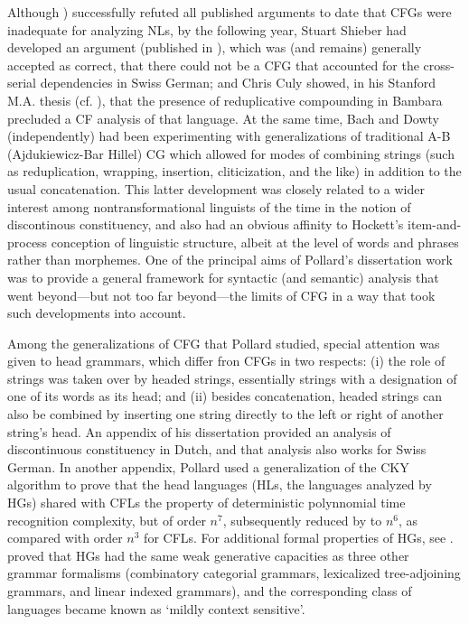 \documentclass[output=paper]{langsci/langscibook}
\begin{document}
Although \citet{PG82a-u-kopiert-original-pdf}) successfully refuted all published arguments to date that CFGs were inadequate for analyzing NLs, by the following year, Stuart Shieber had developed an argument (published in \citet{Shieber85a}), which was (and remains) generally accepted as correct, that there could not be a CFG that accounted for the cross-serial dependencies in Swiss German; and Chris Culy showed, in his Stanford M.A. thesis (cf. \citet{Culy85a}), that the presence of reduplicative compounding in Bambara precluded a CF analysis of that language. At the same time, Bach and Dowty (independently) had been experimenting with generalizations of traditional A-B (Ajdukiewicz-Bar Hillel) CG which allowed for modes of combining strings (such as reduplication, wrapping, insertion, cliticization, and the like) in addition to the usual concatenation. This latter development was closely related to a wider interest among nontransformational linguists of the time in the notion of discontinous constituency, and also had an obvious affinity to Hockett's item-and-process conception of linguistic structure, albeit at the level of words and phrases rather than morphemes. One of the principal aims of Pollard's dissertation work was to provide a general framework for syntactic (and semantic) analysis that went beyond---but not too far beyond---the limits of CFG in a way that took such developments into account. 

Among the generalizations of CFG that Pollard studied, special attention was given to head grammars, which differ fron CFGs in two respects: (i) the role of strings was taken over by headed strings, essentially strings with a designation of one of its words as its head; and (ii) besides concatenation, headed strings can also be combined by inserting one string directly to the left or right of another string's head. An appendix of his dissertation \citep{Pollard84a-u} provided an analysis of discontinuous constituency in Dutch, and that analysis also works for Swiss German. In another appendix, Pollard used a generalization of the CKY algorithm to prove that the head languages (HLs, the languages analyzed by HGs) shared with CFLs the property of deterministic polynnomial time recognition complexity, but of order $n^{7}$, subsequently reduced by \citet{Kasamietal1989} to $n^{6}$, as compared with order $n^{3}$ for CFLs. For additional formal properties of HGs, see \citet{Roach1987}. \citet{VijayWeir1994} proved that HGs had the same weak generative capacities as three other grammar formalisms (combinatory categorial grammars, lexicalized tree-adjoining grammars, and linear indexed grammars), and the corresponding class of languages became known as `mildly context sensitive'.
\end{document}
